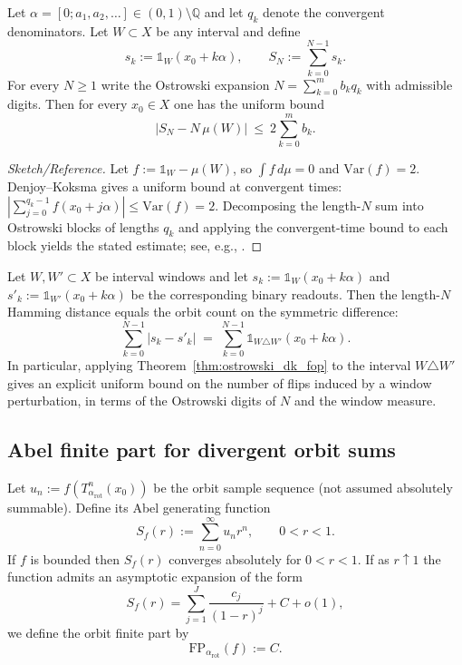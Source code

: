 \begin{theorem}
\label{thm:ostrowski_dk_fop}
Let $\alpha=[0;a_1,a_2,\dots]\in(0,1)\setminus\mathbb{Q}$ and let $q_k$ denote the convergent denominators.
Let $W\subset X$ be any interval and define
\begin{equation}
    s_k:=\mathds{1}_W(x_0+k\alpha),\qquad S_N:=\sum_{k=0}^{N-1}s_k.
\end{equation}
For every $N\ge 1$ write the Ostrowski expansion $N=\sum_{k=0}^{m} b_k q_k$ with admissible digits.
Then for every $x_0\in X$ one has the uniform bound
\begin{equation}
    \bigl|S_N-N\,\mu(W)\bigr|\ \le\ 2\sum_{k=0}^{m} b_k.
\end{equation}
\end{theorem}
\begin{proof}[Sketch/Reference]
Let $f:=\mathds{1}_W-\mu(W)$, so $\int f\,d\mu=0$ and $\mathrm{Var}(f)=2$.
Denjoy--Koksma gives a uniform bound at convergent times: $\left|\sum_{j=0}^{q_k-1} f(x_0+j\alpha)\right|\le \mathrm{Var}(f)=2$.
Decomposing the length-$N$ sum into Ostrowski blocks of lengths $q_k$ and applying the convergent-time bound to each block yields the stated estimate; see, e.g., \cite{Denjoy1932,Koksma1935,KatokHasselblatt1995,Ma2025HPA}.
\end{proof}

\begin{corollary}
\label{cor:window_perturbation_stability}
Let $W,W'\subset X$ be interval windows and let $s_k:=\mathds{1}_W(x_0+k\alpha)$ and $s'_k:=\mathds{1}_{W'}(x_0+k\alpha)$ be the corresponding binary readouts.
Then the length-$N$ Hamming distance equals the orbit count on the symmetric difference:
\begin{equation}
    \sum_{k=0}^{N-1}|s_k-s'_k|\;=\;\sum_{k=0}^{N-1}\mathds{1}_{W\triangle W'}(x_0+k\alpha).
\end{equation}
In particular, applying Theorem~\ref{thm:ostrowski_dk_fop} to the interval $W\triangle W'$ gives an explicit uniform bound on the number of flips induced by a window perturbation, in terms of the Ostrowski digits of $N$ and the window measure.
\end{corollary}

\subsection{Abel finite part for divergent orbit sums}
Let $u_n:=f(T_{\alpha_{\mathrm{rot}}}^n(x_0))$ be the orbit sample sequence (not assumed absolutely summable). Define its Abel generating function
$$
S_f(r):=\sum_{n=0}^{\infty} u_n r^n,\qquad 0<r<1.
$$
If $f$ is bounded then $S_f(r)$ converges absolutely for $0<r<1$. If as $r\uparrow 1$ the function admits an asymptotic expansion of the form
$$
S_f(r)=\sum_{j=1}^{J} \frac{c_j}{(1-r)^j} + C + o(1),
$$
we define the orbit finite part by
$$
\mathrm{FP}_{\alpha_{\mathrm{rot}}}(f):=C.
$$


